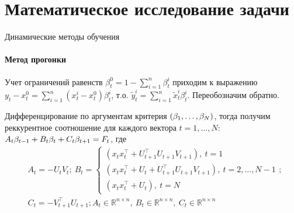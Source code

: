 \documentclass[11pt]{beamer}
\def\trans{^\intercal}
\begin{document}
\section{Математическое исследование задачи}
\begin{frame}{Динамические методы обучения}
\framesubtitle{Метод прогонки}
\begin{block}{Учет ограничений равенств}
$\beta_t^0 = 1-\sum_{i=1}^n \beta_t^i$ приходим к выражению $y_t-x_t^0 = \sum_{i=1}^n(x_t^i-x_t^0)\beta_t^i$, т.о. $\tilde{y}_t^i = \sum_{i=1}^n\tilde{x}_t^i\beta_t^i$. Переобозначим обратно.
\end{block}
Дифференцирование по аргументам критерия  $({{\bf{\beta}}_1},\dots,{{\bf{\beta}}_N})$, тогда получим реккурентное соотношение для каждого вектора $t=1,\dots,N$: $A_t {{\bf{\beta}}_{t-1}} + B_t {{\bf{\beta}}_t} + C_t{{\bf{\beta}}_{t+1}} = F_t$, где 
\begin{align*} &A_t = -U_t V_t;\ B_t = \begin{cases}(x_t x_t \trans + U_{t+1}\trans U_{t+1}V_{t+1}),\ t=1\\ (x_t x_t \trans + U_t + U_{t+1}\trans U_{t+1}V_{t+1}),\ t=2,\dots,N-1\\ (x_t x_t \trans + U_t),\ t=N\end{cases};\\ &C_t =-V_{t+1}\trans U_{t+1}; A_t \in \mathbb R^{n\times n},\ B_t \in \mathbb R^{n\times n},\ C_t \in \mathbb R^{n\times n}
\end{align*}
\end{frame}
\end{document}

